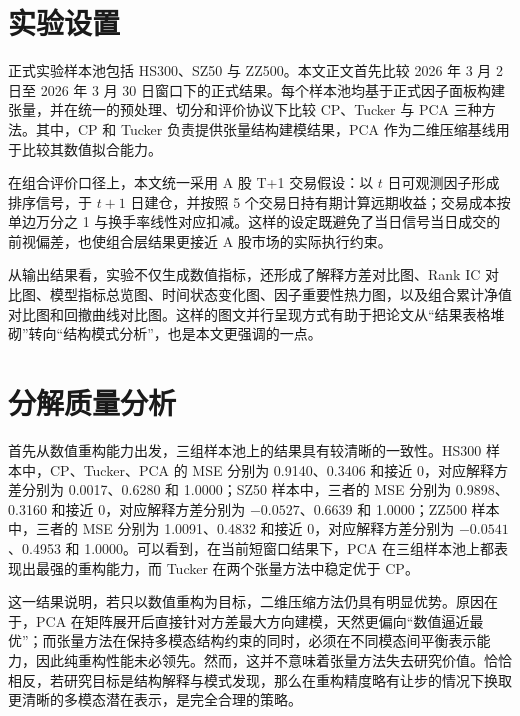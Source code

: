\section{实验设置}

正式实验样本池包括 HS300、SZ50 与 ZZ500。本文正文首先比较 2026 年 3 月 2 日至 2026 年 3 月 30 日窗口下的正式结果。每个样本池均基于正式因子面板构建张量，并在统一的预处理、切分和评价协议下比较 CP、Tucker 与 PCA 三种方法。其中，CP 和 Tucker 负责提供张量结构建模结果，PCA 作为二维压缩基线用于比较其数值拟合能力。

在组合评价口径上，本文统一采用 A 股 T+1 交易假设：以 $t$ 日可观测因子形成排序信号，于 $t+1$ 日建仓，并按照 5 个交易日持有期计算远期收益；交易成本按单边万分之 1 与换手率线性对应扣减。这样的设定既避免了当日信号当日成交的前视偏差，也使组合层结果更接近 A 股市场的实际执行约束。

从输出结果看，实验不仅生成数值指标，还形成了解释方差对比图、Rank IC 对比图、模型指标总览图、时间状态变化图、因子重要性热力图，以及组合累计净值对比图和回撤曲线对比图。这样的图文并行呈现方式有助于把论文从“结果表格堆砌”转向“结构模式分析”，也是本文更强调的一点。

\section{分解质量分析}

首先从数值重构能力出发，三组样本池上的结果具有较清晰的一致性。HS300 样本中，CP、Tucker、PCA 的 MSE 分别为 0.9140、0.3406 和接近 0，对应解释方差分别为 0.0017、0.6280 和 1.0000；SZ50 样本中，三者的 MSE 分别为 0.9898、0.3160 和接近 0，对应解释方差分别为 $-0.0527$、0.6639 和 1.0000；ZZ500 样本中，三者的 MSE 分别为 1.0091、0.4832 和接近 0，对应解释方差分别为 $-0.0541$、0.4953 和 1.0000。可以看到，在当前短窗口结果下，PCA 在三组样本池上都表现出最强的重构能力，而 Tucker 在两个张量方法中稳定优于 CP。

这一结果说明，若只以数值重构为目标，二维压缩方法仍具有明显优势。原因在于，PCA 在矩阵展开后直接针对方差最大方向建模，天然更偏向“数值逼近最优”；而张量方法在保持多模态结构约束的同时，必须在不同模态间平衡表示能力，因此纯重构性能未必领先。然而，这并不意味着张量方法失去研究价值。恰恰相反，若研究目标是结构解释与模式发现，那么在重构精度略有让步的情况下换取更清晰的多模态潜在表示，是完全合理的策略。

